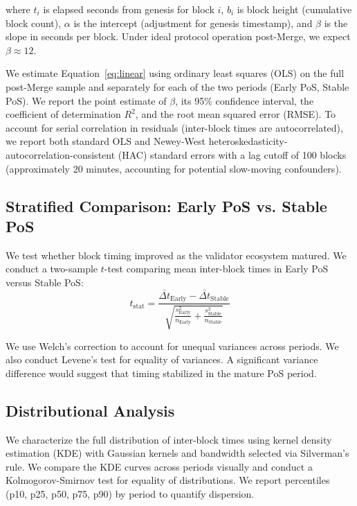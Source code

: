 \documentclass[12pt]{article}
\begin{document}
where $t_i$ is elapsed seconds from genesis for block $i$, $b_i$ is block height (cumulative block count), $\alpha$ is the intercept (adjustment for genesis timestamp), and $\beta$ is the slope in seconds per block. Under ideal protocol operation post-Merge, we expect $\beta \approx 12$.

We estimate Equation~\eqref{eq:linear} using ordinary least squares (OLS) on the full post-Merge sample and separately for each of the two periods (Early PoS, Stable PoS). We report the point estimate of $\beta$, its 95\% confidence interval, the coefficient of determination $R^2$, and the root mean squared error (RMSE). To account for serial correlation in residuals (inter-block times are autocorrelated), we report both standard OLS and Newey-West heteroskedasticity-autocorrelation-consistent (HAC) standard errors with a lag cutoff of 100 blocks (approximately 20 minutes, accounting for potential slow-moving confounders).

\subsection{Stratified Comparison: Early PoS vs. Stable PoS}

We test whether block timing improved as the validator ecosystem matured. We conduct a two-sample $t$-test comparing mean inter-block times in Early PoS versus Stable PoS:
\begin{equation}
t_{\text{stat}} = \frac{\bar{\Delta t}_{\text{Early}} - \bar{\Delta t}_{\text{Stable}}}{\sqrt{\frac{s^2_{\text{Early}}}{n_{\text{Early}}} + \frac{s^2_{\text{Stable}}}{n_{\text{Stable}}}}}
\end{equation}

We use Welch's correction to account for unequal variances across periods. We also conduct Levene's test for equality of variances. A significant variance difference would suggest that timing stabilized in the mature PoS period.

\subsection{Distributional Analysis}

We characterize the full distribution of inter-block times using kernel density estimation (KDE) with Gaussian kernels and bandwidth selected via Silverman's rule. We compare the KDE curves across periods visually and conduct a Kolmogorov-Smirnov test for equality of distributions. We report percentiles (p10, p25, p50, p75, p90) by period to quantify dispersion.
\end{document}
